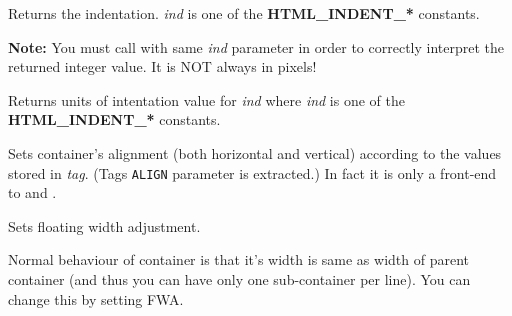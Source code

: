 
\label{wxhtmlcontainercellgetindent}


Returns the indentation. {\it ind} is one of the {\bf HTML\_INDENT\_*} constants.

{\bf Note:} You must call 
with same {\it ind} parameter in order to correctly interpret the returned integer value.
It is NOT always in pixels!

\label{wxhtmlcontainercellgetindentunits}


Returns units of intentation value for {\it ind} where {\it ind} is one
of the {\bf HTML\_INDENT\_*} constants.


\label{wxhtmlcontainercellsetalign}


Sets container's alignment (both horizontal and vertical) according to
the values stored in {\it tag}. (Tags {\tt ALIGN} parameter is extracted.) In fact
it is only a front-end to 
and .


\label{wxhtmlcontainercellsetwidthfloat}



Sets floating width adjustment. 

Normal behaviour of container is that it's width is same as width of 
parent container (and thus you can have only one sub-container per line).
You can change this by setting FWA.

